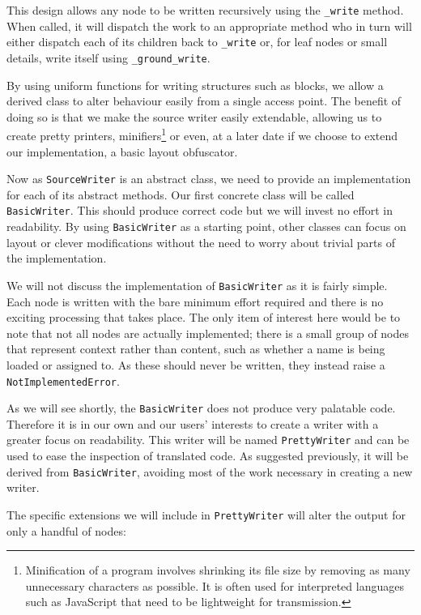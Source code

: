 \documentclass[twoside,a4paper]{report}
\begin{document}
This design allows any node to be written recursively using the \texttt{\_write} method. When called, it will dispatch the work to an appropriate method who
in turn will either dispatch each of its children back to \texttt{\_write} or, for leaf nodes or small details, write itself using
\texttt{\_ground\_write}.

By using uniform functions for writing structures such as blocks, we allow a derived class to alter behaviour easily from
a single access point. The benefit of doing so is that we make the source writer easily extendable, allowing us to create pretty printers,
minifiers\footnote{Minification of a program involves shrinking its file size by removing as many unnecessary characters as possible. It is
often used for interpreted languages such as JavaScript that need to be lightweight for transmission.} or even, at a later date if we choose
to extend our implementation, a basic layout obfuscator.

Now as \texttt{SourceWriter} is an abstract class, we need to provide an implementation for each of its abstract methods. Our first concrete class
will be called \texttt{BasicWriter}. This should produce correct code but we will invest no effort in readability. By using \texttt{BasicWriter} as
a starting point, other classes can focus on layout or clever modifications without the need to worry about trivial parts of the implementation.

We will not discuss the implementation of \texttt{BasicWriter} as it is fairly simple. Each node is written with the bare minimum effort required
and there is no exciting processing that takes place. The only item of interest here would be to note that not all nodes are actually implemented;
there is a small group of nodes that represent context rather than content, such as whether a name is being loaded or assigned to. As these should
never be written, they instead raise a \texttt{NotImplementedError}.

As we will see shortly, the \texttt{BasicWriter} does not produce very palatable code. Therefore it is in our own and our users' interests to
create a writer with a greater focus on readability. This writer will be named \texttt{PrettyWriter} and can be used to ease the inspection of
translated code. As suggested previously, it will be derived from \texttt{BasicWriter}, avoiding most of the work necessary in creating a new writer.

The specific extensions we will include in \texttt{PrettyWriter} will alter the output for only a handful of nodes:
\end{document}
